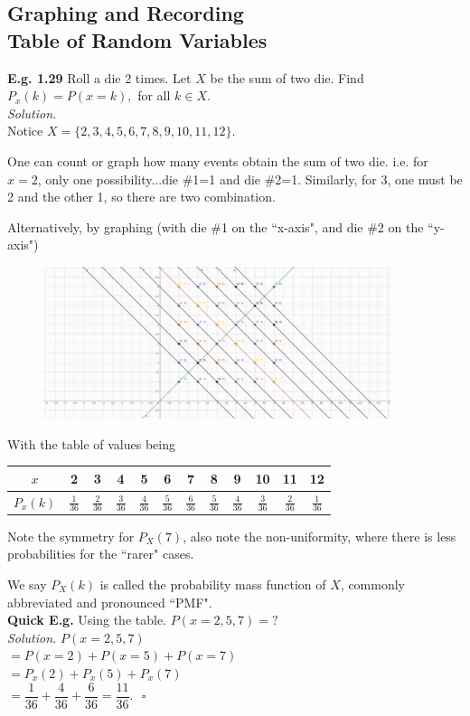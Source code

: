 \documentclass[12pt]{book}
\begin{document}
\subsection{Graphing and Recording \\Table of Random Variables}
\noindent \textbf{E.g. 1.29} Roll a die 2 times. Let $X$ be the sum of two die. Find $P_x(k)=P(x=k),$ for all $k\in X$.\\
\textit{Solution.}\\
Notice $X=\{2,3,4,5,6,7,8,9,10,11,12\}$.

One can count or graph how many events obtain the sum of two die.
i.e. for $x=2$, only one possibility...die \#1=1 and die \#2=1.
Similarly, for 3, one must be 2 and the other 1, so there are two combination.

Alternatively, by graphing (with die \#1 on the ``x-axis", and die \#2 on the ``y-axis")

\begin{figure}[h]
  \includegraphics[width=4in]{PMF of 2 dice.png}
\end{figure}
\noindent With the table of values being
\begin{center}
\begin{tabular}{ |c|c|c|c|c|c|c|c|c|c|c|c| }
\hline
	$x$ & 2 & 3 & 4 & 5 & 6 & 7 & 8 & 9 & 10 & 11 & 12 \\
\hline 
	$P_{x}(k)$ & $\frac{1}{36}$ & $\frac{2}{36}$ & $\frac{3}{36}$ & $\frac{4}{36}$ & $\frac{5}{36}$ & $\frac{6}{36}$ & $\frac{5}{36}$ & $\frac{4}{36}$ & $\frac{3}{36}$ & $\frac{2}{36}$ & $\frac{1}{36}$  \\
\hline
\end{tabular}
\end{center}
Note the symmetry for $P_{X}(7)$, also note the non-uniformity, where there is less probabilities for the ``rarer" cases.

We say $P_{X}(k)$ is called the probability mass function of $X$, commonly abbreviated and pronounced ``PMF".\\

\noindent \textbf{Quick E.g.} Using the table. $P(x=2,5,7)=?$\\
\noindent \textit{Solution.}
$P(x=2,5,7)$\\
$= P(x=2)+P(x=5) +P(x=7)$\\
$=P_{x}(2)+P_{x}(5)+P_{x}(7)$\\
$=\dfrac{1}{36} + \dfrac{4}{36} + \dfrac{6}{36}= \dfrac{11}{36}.~~~\square$\\
\end{document}
